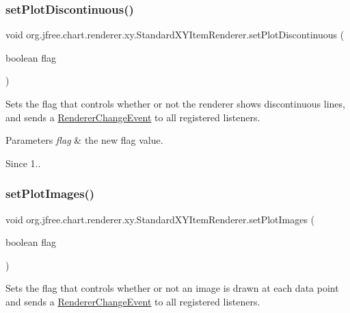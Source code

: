 \subsubsection{\texorpdfstring{set\+Plot\+Discontinuous()}{setPlotDiscontinuous()}}
{\footnotesize\ttfamily void org.\+jfree.\+chart.\+renderer.\+xy.\+Standard\+X\+Y\+Item\+Renderer.\+set\+Plot\+Discontinuous (\begin{DoxyParamCaption}\item[{boolean}]{flag }\end{DoxyParamCaption})}

Sets the flag that controls whether or not the renderer shows discontinuous lines, and sends a \mbox{\hyperlink{}{Renderer\+Change\+Event}} to all registered listeners.


\begin{DoxyParams}{Parameters}
{\em flag} & the new flag value.\\
\hline
\end{DoxyParams}
\begin{DoxySince}{Since}
1.. 
\end{DoxySince}
\mbox{\label{classorg_1_1jfree_1_1chart_1_1renderer_1_1xy_1_1_standard_x_y_item_renderer_adfb9bbb5844a0cb4b60a51c5b8914a59}} 
\subsubsection{\texorpdfstring{set\+Plot\+Images()}{setPlotImages()}}
{\footnotesize\ttfamily void org.\+jfree.\+chart.\+renderer.\+xy.\+Standard\+X\+Y\+Item\+Renderer.\+set\+Plot\+Images (\begin{DoxyParamCaption}\item[{boolean}]{flag }\end{DoxyParamCaption})}

Sets the flag that controls whether or not an image is drawn at each data point and sends a \mbox{\hyperlink{}{Renderer\+Change\+Event}} to all registered listeners.


